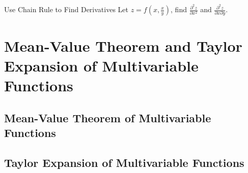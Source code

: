 \begin{example}{Use Chain Rule to Find Derivatives}{}
  Let $z = f \left( x, \frac{x}{y} \right)$, find $\frac{\partial^2 z}{\partial
    x^2}$ and $\frac{\partial^2 z}{\partial x\partial y}$.
\end{example}



\section{Mean-Value Theorem and Taylor Expansion of Multivariable Functions}

\subsection{Mean-Value Theorem of Multivariable Functions}

\subsection{Taylor Expansion of Multivariable Functions}








